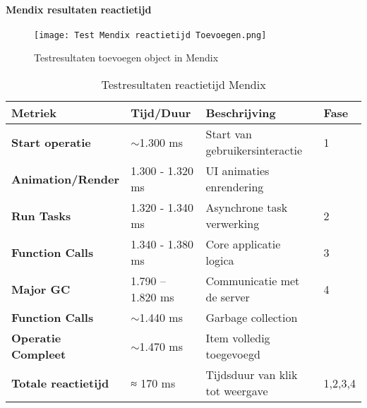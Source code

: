 \newpage




\paragraph{Mendix resultaten reactietijd}

\begin{figure}[H]
    \centering
    \captionsetup{justification=centering}
    \texttt{[image: Test Mendix reactietijd Toevoegen.png]}
    \caption[Testresultaten toevoegen object in Mendix]{\label{fig:reactietijd-Mendix} Testresultaten toevoegen object in Mendix}
\end{figure}


\begin{table}[H]
    \centering
    \begin{tabular}{|p{4cm}|p{3cm}|p{6cm}|p{1cm}|}
        \hline
        \textbf{Metriek}   & \textbf{Tijd/Duur} & \textbf{Beschrijving} & \textbf{Fase} \\
        \hline
        \textbf{Start operatie} & $\sim$1.300 ms & Start van gebruikersinteractie & 1 \\
        \cline{1-3}
        \textbf{Animation/Render} & 1.300 - 1.320 ms & \gls{UI} animaties enrendering & \\
        \hline
        \textbf{Run Tasks} & 1.320 - 1.340 ms & Asynchrone task verwerking & 2 \\
        \hline
        \textbf{Function Calls} & 1.340 - 1.380 ms & Core applicatie logica & 3 \\
        \hline                       
        \textbf{Major \gls{GC}} & 1.790 – 1.820 ms & Communicatie met de server & 4 \\
        \cline{1-3}
        \textbf{Function Calls} & 	$\sim$1.440 ms & Garbage collection & \\
        \cline{1-3}
        \textbf{Operatie Compleet} & $\sim$1.470 ms & 	Item volledig toegevoegd & \\
        \hline
        \textbf{Totale reactietijd} &  ≈ 170 ms & Tijdsduur van klik tot weergave & 1,2,3,4 \\
        \hline
    \end{tabular}
    \caption[\centering Testresultaten reactietijd Mendix]{\label{tab:Testresultaten Mendix reactietijd}Testresultaten reactietijd Mendix}
\end{table}

